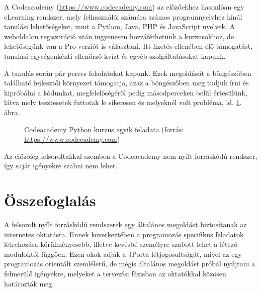 A Codeacademy (\url{https://www.codecademy.com}) az előzőekhez hasonlóan egy eLearning rendszer, mely felhasználói számára számos programnyelvhez kínál tanulási lehetőségeket, mint a Python, Java, PHP és JavaScript nyelvek. A weboldalon regisztráció után ingyenesen hozzáférhetünk a kurzusokhoz, de lehetőségünk van a Pro verziót is választani. Itt fizetés ellenében élő támogatást, tanulási egységenkénti ellenőrző kvízt és egyéb szolgáltatásokat kapunk. \cite{CodeacademyPro}

A tanulás során pár perces feladatokat kapunk. Ezek megoldását a böngészőben található fejlesztői környezet támogatja, azaz a böngészőben meg tudjuk írni és kipróbálni a kódunkat, megfelelőségéről pedig másodperceken belül értesülünk, látva mely tesztesetek futtotak le sikeresen és melyeknél volt probléma, ld. \ref{fig:codeacademy}. ábra.

\begin{figure}[h]
    \centering
    \caption[Codeacademy Python kurzus egyik feladata]{Codeacademy Python kurzus egyik feladata (forrás: \url{https://www.codecademy.com})}
    \label{fig:codeacademy}
\end{figure}

Az előzőleg felsoroltakkal szemben a Codeacademy nem nyílt forráskódú rendszer, így saját igényekre szabni nem lehet.

\section{Összefoglalás}

A felsorolt nyílt forráskódú rendszerek egy általános megoldást biztosítanak az internetes oktatásra. Ennek következtében a programozás specifikus feladatok létrehozása körülményesebb, illetve kevésbé személyre szabott lehet a létező moduloktól függően. Ezen okok adják a JPorta létjogosultságát, mivel az egy programozás orientált szemléletű, de mégis általános megoldást próbál nyújtani a felmerülő igényekre, melyeket a tervezési fázisban az oktatókkal közösen határozták meg.